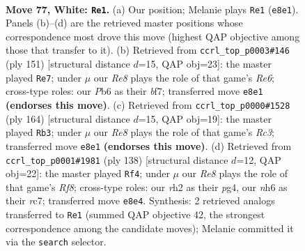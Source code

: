 \documentclass[11pt]{article}
\begin{document}
\clearpage

\begin{figure}[p]\centering
\begin{subfigure}{0.46\textwidth}\centering
\resizebox{\linewidth}{!}{%
\newchessgame
\chessboard[
  setfen={4R3/5k2/1P5n/P7/8/1K6/7r/8 w - - 17 77},
  showmover=false,
  pgfstyle=straightmove, color=movearrow, markmove={e8-e1}
]}
\caption{}
\end{subfigure}\hfill
\begin{subfigure}{0.46\textwidth}\centering
\resizebox{\linewidth}{!}{%
\newchessgame
\chessboard[
  setfen={8/5B2/7p/8/3K2k1/1N2r3/8/8 b - - 0 76},
  showmover=false,
  pgfstyle=straightmove, color=movearrow, markmove={e3-e7}
]}
\caption{}
\end{subfigure}
\\[4pt]
\begin{subfigure}{0.46\textwidth}\centering
\resizebox{\linewidth}{!}{%
\newchessgame
\chessboard[
  setfen={8/7r/8/8/1P1k4/P1R5/5K2/8 w - - 15 83},
  showmover=false,
  pgfstyle=straightmove, color=movearrow, markmove={c3-b3}
]}
\caption{}
\end{subfigure}\hfill
\begin{subfigure}{0.46\textwidth}\centering
\resizebox{\linewidth}{!}{%
\newchessgame
\chessboard[
  setfen={5R2/2r3k1/8/8/6p1/4K1P1/8/8 w - - 10 70},
  showmover=false,
  pgfstyle=straightmove, color=movearrow, markmove={f8-f4}
]}
\caption{}
\end{subfigure}
\caption{\textbf{Move 77, White: \texttt{Re1}.} (a) Our position; Melanie plays \texttt{Re1} (\texttt{e8e1}). Panels (b)--(d) are the retrieved master positions whose correspondence most drove this move (highest QAP objective among those that transfer to it). (b) Retrieved from \texttt{ccrl\_top\_p0003\#146} (ply 151) [structural distance $d$=15, QAP obj=23]: the master played \texttt{Re7}; under $\mu$ our \emph{Re8} plays the role of that game's \emph{Re6}; cross-type roles: our \emph{P}b6 as their \emph{b}f7; transferred move \texttt{e8e1} \textbf{(endorses this move)}. (c) Retrieved from \texttt{ccrl\_top\_p0000\#1528} (ply 164) [structural distance $d$=15, QAP obj=19]: the master played \texttt{Rb3}; under $\mu$ our \emph{Re8} plays the role of that game's \emph{Rc3}; transferred move \texttt{e8e1} \textbf{(endorses this move)}. (d) Retrieved from \texttt{ccrl\_top\_p0001\#1981} (ply 138) [structural distance $d$=12, QAP obj=22]: the master played \texttt{Rf4}; under $\mu$ our \emph{Re8} plays the role of that game's \emph{Rf8}; cross-type roles: our \emph{r}h2 as their \emph{p}g4, our \emph{n}h6 as their \emph{r}c7; transferred move \texttt{e8e4}. Synthesis: 2 retrieved analogs transferred to \texttt{Re1} (summed QAP objective 42, the strongest correspondence among the candidate moves); Melanie committed it via the \texttt{search} selector.}
\label{fig:thought-m152}
\end{figure}
\end{document}
